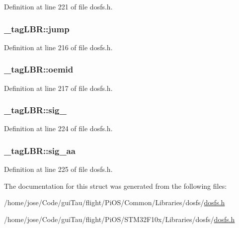 Definition at line 221 of file dosfs.\-h.

\hypertarget{struct__tag_l_b_r_ab0f59cb4457c23b8644896990cfde9fa}{
\subsubsection[{jump}]{ \-\_\-tag\-L\-B\-R\-::jump}}\label{struct__tag_l_b_r_ab0f59cb4457c23b8644896990cfde9fa}


Definition at line 216 of file dosfs.\-h.

\hypertarget{struct__tag_l_b_r_a014fa7053028c54af3aafa297b1ab734}{
\subsubsection[{oemid}]{ \-\_\-tag\-L\-B\-R\-::oemid}}\label{struct__tag_l_b_r_a014fa7053028c54af3aafa297b1ab734}


Definition at line 217 of file dosfs.\-h.

\hypertarget{struct__tag_l_b_r_ac436541abd5f2d88777d476818be6e8b}{
\subsubsection[{sig\-\_\-55}]{ \-\_\-tag\-L\-B\-R\-::sig\-\_}}\label{struct__tag_l_b_r_ac436541abd5f2d88777d476818be6e8b}


Definition at line 224 of file dosfs.\-h.

\hypertarget{struct__tag_l_b_r_a29f47076e3080b467ae86ea92a5ca8e1}{
\subsubsection[{sig\-\_\-aa}]{ \-\_\-tag\-L\-B\-R\-::sig\-\_\-aa}}\label{struct__tag_l_b_r_a29f47076e3080b467ae86ea92a5ca8e1}


Definition at line 225 of file dosfs.\-h.



The documentation for this struct was generated from the following files\-:\begin{DoxyCompactItemize}
\item 
/home/jose/\-Code/gui\-Tau/flight/\-Pi\-O\-S/\-Common/\-Libraries/dosfs/\hyperlink{_common_2_libraries_2dosfs_2dosfs_8h}{dosfs.\-h}\item 
/home/jose/\-Code/gui\-Tau/flight/\-Pi\-O\-S/\-S\-T\-M32\-F10x/\-Libraries/dosfs/\hyperlink{_s_t_m32_f10x_2_libraries_2dosfs_2dosfs_8h}{dosfs.\-h}\end{DoxyCompactItemize}
